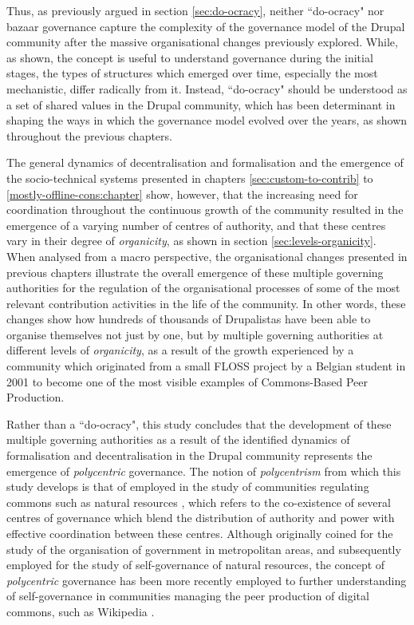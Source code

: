 Thus, as previously argued in section \ref{sec:do-ocracy}, neither ``do-ocracy" nor bazaar governance capture the complexity of the governance model of the Drupal community after the massive organisational changes previously explored. While, as shown, the concept is useful to understand governance during the initial stages, the types of structures which emerged over time, especially the most mechanistic, differ radically from it. Instead, ``do-ocracy" should be understood as a set of shared values in the Drupal community, which has been determinant in shaping the ways in which the governance model evolved over the years, as shown throughout the previous chapters.

The general dynamics of decentralisation and formalisation and the emergence of the socio-technical systems presented in chapters \ref{sec:custom-to-contrib} to \ref{mostly-offline-cons:chapter} show, however, that the increasing need for coordination throughout the continuous growth of the community resulted in the emergence of a varying number of centres of authority, and that these centres vary in their degree of \textit{organicity}, as shown in section \ref{sec:levels-organicity}. When analysed from a macro perspective, the organisational changes presented in previous chapters illustrate the overall emergence of these multiple governing authorities for the regulation of the organisational processes of some of the most relevant contribution activities in the life of the community. In other words, these changes show how hundreds of thousands of Drupalistas have been able to organise themselves not just by one, but by multiple governing authorities at different levels of \textit{organicity}, as a result of the growth experienced by a community which originated from a small FLOSS project by a Belgian student in 2001 to become one of the most visible examples of Commons-Based Peer Production.

Rather than a ``do-ocracy", this study concludes that the development of these multiple governing authorities as a result of the identified dynamics of formalisation and decentralisation in the Drupal community represents the emergence of \textit{polycentric} governance. The notion of \textit{polycentrism} from which this study develops is that of \textcite*{ostrom1961organization} employed in the study of communities regulating commons such as natural resources \parencite[e.g.][]{gelcich2014towards}, which refers to the co-existence of several centres of governance which blend the distribution of authority and power with effective coordination between these centres. Although originally coined for the study of the organisation of government in metropolitan areas, and subsequently employed for the study of self-governance of natural resources, the concept of \textit{polycentric} governance has been more recently employed to further understanding of self-governance in communities managing the peer production of digital commons, such as Wikipedia \parencite{hartswood2014towards}.

